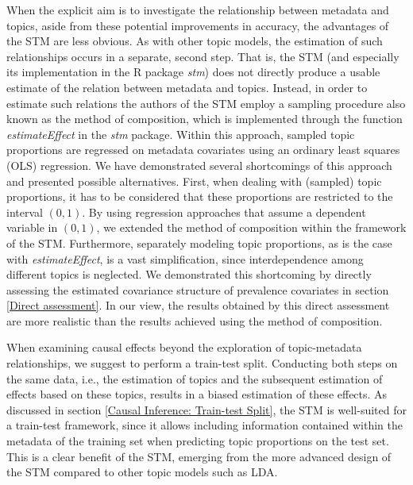When the explicit aim is to investigate the relationship between metadata and topics, aside from these potential improvements in accuracy, the advantages of the STM are less obvious. As with other topic models, the estimation of such relationships occurs in a separate, second step. That is, the STM (and especially its implementation in the R package \textit{stm}) does not directly produce a usable estimate of the relation between metadata and topics. Instead, in order to estimate such relations the authors of the STM employ a sampling procedure also known as the method of composition, which is implemented through the function \textit{estimateEffect} in the \textit{stm} package. Within this approach, sampled topic proportions are regressed on metadata covariates using an ordinary least squares (OLS) regression. We have demonstrated several shortcomings of this approach and presented possible alternatives. First, when dealing with (sampled) topic proportions, it has to be considered that these proportions are restricted to the interval $(0,1)$. By using regression approaches that assume a dependent variable in $(0,1)$, we extended the method of composition within the framework of the STM. Furthermore, separately modeling topic proportions, as is the case with \textit{estimateEffect}, is a vast simplification, since interdependence among different topics is neglected. We demonstrated this shortcoming by directly assessing the estimated covariance structure of prevalence covariates in section \ref{Direct assessment}. In our view, the results obtained by this direct assessment are more realistic than the results achieved using the method of composition. 

When examining causal effects beyond the exploration of topic-metadata relationships, we suggest to perform a train-test split. Conducting both steps on the same data, i.e., the estimation of topics and the subsequent estimation of effects based on these topics, results in a biased estimation of these effects. As discussed in section \ref{Causal Inference: Train-test Split}, the STM is well-suited for a train-test framework, since it allows including information contained within the metadata of the training set when predicting topic proportions on the test set. This is a clear benefit of the STM, emerging from the more advanced design of the STM compared to other topic models such as LDA.